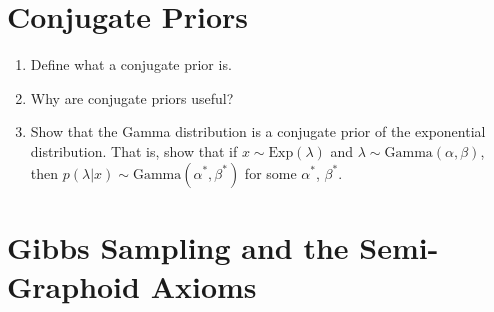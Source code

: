 \documentclass[11pt]{article}
\begin{document}
\pagebreak
\section{Conjugate Priors}
\begin{enumerate}
\item Define what a conjugate prior is.\\
\begin{answertext}{3cm}{}  
\end{answertext} 

\item Why are conjugate priors useful? \\
\begin{answertext}{3cm}{}
\end{answertext} 

\item Show that the Gamma distribution is a conjugate prior of the exponential distribution. That is, show that if $x \sim \text{Exp}(\lambda)$ and $\lambda \sim \text{Gamma}(\alpha, \beta)$, then $p(\lambda | x) \sim \text{Gamma}(\alpha^*, \beta^*)$ for some $\alpha^*$, $\beta^*$. \\
\begin{answertext}{6cm}{}
\end{answertext} 
\end{enumerate}

\pagebreak
\section{Gibbs Sampling and the Semi-Graphoid Axioms}
\end{document}
